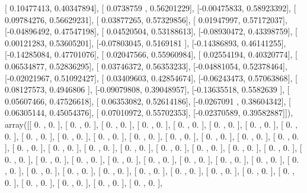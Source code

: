 \documentclass{article}
\begin{document}
       [ 0.10477413,  0.40347894],
       [ 0.0738759 ,  0.56201229],
       [-0.00475833,  0.58923392],
       [ 0.09784276,  0.56629231],
       [ 0.03877265,  0.57329856],
       [ 0.01947997,  0.57172037],
       [-0.04896492,  0.47547198],
       [ 0.04520504,  0.53188613],
       [-0.08930472,  0.43398759],
       [ 0.00121283,  0.53605201],
       [-0.07803045,  0.5169181 ],
       [-0.14386893,  0.46141255],
       [-0.14285084,  0.47701076],
       [ 0.02047566,  0.55960984],
       [ 0.02554194,  0.40320774],
       [ 0.06534877,  0.52836295],
       [ 0.03746372,  0.56353233],
       [-0.04881054,  0.52378464],
       [-0.02021967,  0.51092427],
       [ 0.03409603,  0.42854674],
       [-0.06243473,  0.57063868],
       [ 0.08127573,  0.4946806 ],
       [-0.09079808,  0.39048957],
       [-0.13635518,  0.5582639 ],
       [ 0.05607466,  0.47526618],
       [ 0.06353082,  0.52614186],
       [-0.0267091 ,  0.38604342],
       [ 0.06305144,  0.45054376],
       [ 0.07010972,  0.55702353],
       [-0.02370589,  0.39582887]]), array([[ 0.        ,  0.        ],
       [ 0.        ,  0.        ],
       [ 0.        ,  0.        ],
       [ 0.        ,  0.        ],
       [ 0.        ,  0.        ],
       [ 0.        ,  0.        ],
       [ 0.        ,  0.        ],
       [ 0.        ,  0.        ],
       [ 0.        ,  0.        ],
       [ 0.        ,  0.        ],
       [ 0.        ,  0.        ],
       [ 0.        ,  0.        ],
       [ 0.        ,  0.        ],
       [ 0.        ,  0.        ],
       [ 0.        ,  0.        ],
       [ 0.        ,  0.        ],
       [ 0.        ,  0.        ],
       [ 0.        ,  0.        ],
       [ 0.        ,  0.        ],
       [ 0.        ,  0.        ],
       [ 0.        ,  0.        ],
       [ 0.        ,  0.        ],
       [ 0.        ,  0.        ],
       [ 0.        ,  0.        ],
       [ 0.        ,  0.        ],
       [ 0.        ,  0.        ],
       [ 0.        ,  0.        ],
       [ 0.        ,  0.        ],
       [ 0.        ,  0.        ],
       [ 0.        ,  0.        ],
       [ 0.        ,  0.        ],
       [ 0.        ,  0.        ],
       [ 0.        ,  0.        ],
       [ 0.        ,  0.        ],
       [ 0.        ,  0.        ],
       [ 0.        ,  0.        ],
       [ 0.        ,  0.        ],
       [ 0.        ,  0.        ],
       [ 0.        ,  0.        ],
       [ 0.        ,  0.        ],
       [ 0.        ,  0.        ],
       [ 0.        ,  0.        ],
       [ 0.        ,  0.        ],
       [ 0.        ,  0.        ],
       [ 0.        ,  0.        ],
\end{document}

